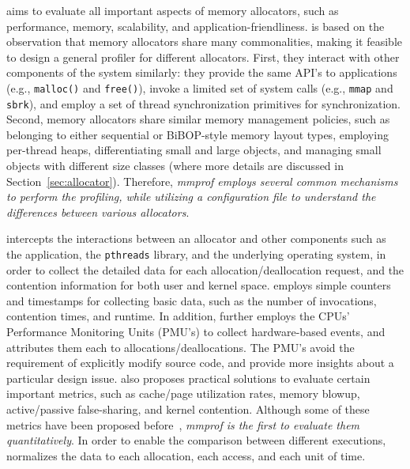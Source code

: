 \MP{} aims to evaluate all important aspects of memory allocators, such as performance, memory, scalability, and application-friendliness. \MP{} is based on the observation that memory allocators share many commonalities, making it feasible to design a general profiler for different allocators. First, they interact with other components of the system similarly: they provide the same API's to applications (e.g., \texttt{malloc()} and \texttt{free()}), invoke a limited set of system calls (e.g., \texttt{mmap} and \texttt{sbrk}), and employ a set of thread synchronization primitives for synchronization. Second, memory allocators share similar memory management policies, such as belonging to either sequential or BiBOP-style memory layout types, employing per-thread heaps, differentiating small and large objects, and managing small objects with different size classes (where more details are discussed in Section~\ref{sec:allocator}). Therefore, \textit{mmprof employs several common mechanisms to perform the profiling, while utilizing a configuration file to understand the differences between various allocators}.    

\MP{} intercepts the interactions between an allocator and other components such as the application, the \texttt{pthreads} library, and the underlying operating system, in order to collect the detailed data for each allocation/deallocation request, and the contention information for both user and kernel space. 
 \MP{} employs simple counters and timestamps for collecting basic data, such as the number of invocations, contention times, and runtime. In addition, \MP{} further employs the CPUs' Performance Monitoring Units (PMU's) to collect hardware-based events, and attributes them each to allocations/deallocations. The PMU's avoid the requirement of explicitly modify source code, and provide more insights about a particular design issue. \MP{} also proposes practical solutions to evaluate certain important metrics, such as cache/page utilization rates, memory blowup, active/passive false-sharing, and kernel contention. Although some of these metrics have been proposed before~\cite{Hoard}, \textit{mmprof is the first to evaluate them quantitatively}. In order to enable the comparison between different executions, \MP{} normalizes the data to each allocation, each access, and each unit of time.  


